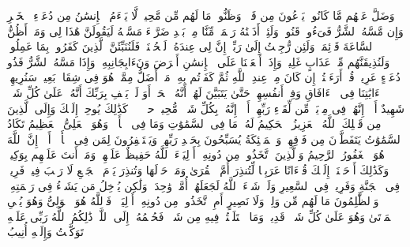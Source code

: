\stopbuffer%
\startbuffer[\q:41:48]
وَضَلَّ عَنۡهُم مَّا كَانُوا۟ یَدۡعُونَ مِن قَبۡلُۖ وَظَنُّوا۟ مَا لَهُم مِّن مَّحِیصࣲ%
\stopbuffer%
\startbuffer[\q:41:49]
لَّا یَسۡءَمُ ٱلۡإِنسَٰنُ مِن دُعَاۤءِ ٱلۡخَیۡرِ وَإِن مَّسَّهُ ٱلشَّرُّ فَیَءُوسࣱ قَنُوطࣱ%
\stopbuffer%
\startbuffer[\q:41:50]
وَلَئِنۡ أَذَقۡنَٰهُ رَحۡمَةࣰ مِّنَّا مِنۢ بَعۡدِ ضَرَّاۤءَ مَسَّتۡهُ لَیَقُولَنَّ هَٰذَا لِی وَمَاۤ أَظُنُّ ٱلسَّاعَةَ قَاۤئِمَةࣰ وَلَئِن رُّجِعۡتُ إِلَىٰ رَبِّیۤ إِنَّ لِی عِندَهُۥ لَلۡحُسۡنَىٰۚ فَلَنُنَبِّئَنَّ ٱلَّذِینَ كَفَرُوا۟ بِمَا عَمِلُوا۟ وَلَنُذِیقَنَّهُم مِّنۡ عَذَابٍ غَلِیظࣲ%
\stopbuffer%
\startbuffer[\q:41:51]
وَإِذَاۤ أَنۡعَمۡنَا عَلَى ٱلۡإِنسَٰنِ أَعۡرَضَ وَنَءَابِجَانِبِهِۦ وَإِذَا مَسَّهُ ٱلشَّرُّ فَذُو دُعَاۤءٍ عَرِیضࣲ%
\stopbuffer%
\startbuffer[\q:41:52]
قُلۡ أَرَءَیۡتُمۡ إِن كَانَ مِنۡ عِندِ ٱللَّهِ ثُمَّ كَفَرۡتُم بِهِۦ مَنۡ أَضَلُّ مِمَّنۡ هُوَ فِی شِقَاقِۭ بَعِیدࣲ%
\stopbuffer%
\startbuffer[\q:41:53]
سَنُرِیهِمۡ ءَایَٰتِنَا فِی ٱلۡءَافَاقِ وَفِیۤ أَنفُسِهِمۡ حَتَّىٰ یَتَبَیَّنَ لَهُمۡ أَنَّهُ ٱلۡحَقُّۗ أَوَ لَمۡ یَكۡفِ بِرَبِّكَ أَنَّهُۥ عَلَىٰ كُلِّ شَیۡءࣲ شَهِیدٌ%
\stopbuffer%
\startbuffer[\q:41:54]
أَلَاۤ إِنَّهُمۡ فِی مِرۡیَةࣲ مِّن لِّقَاۤءِ رَبِّهِمۡۗ أَلَاۤ إِنَّهُۥ بِكُلِّ شَیۡءࣲ مُّحِیطُۢ%
\stopbuffer%
\startbuffer[\q:42:1]
حمۤ%
\stopbuffer%
\startbuffer[\q:42:2]
عۤسۤقۤ%
\stopbuffer%
\startbuffer[\q:42:3]
كَذَٰلِكَ یُوحِیۤ إِلَیۡكَ وَإِلَى ٱلَّذِینَ مِن قَبۡلِكَ ٱللَّهُ ٱلۡعَزِیزُ ٱلۡحَكِیمُ%
\stopbuffer%
\startbuffer[\q:42:4]
لَهُۥ مَا فِی ٱلسَّمَٰوَٰتِ وَمَا فِی ٱلۡأَرۡضِۖ وَهُوَ ٱلۡعَلِیُّ ٱلۡعَظِیمُ%
\stopbuffer%
\startbuffer[\q:42:5]
تَكَادُ ٱلسَّمَٰوَٰتُ یَتَفَطَّرۡنَ مِن فَوۡقِهِنَّۚ وَٱلۡمَلَٰۤئِكَةُ یُسَبِّحُونَ بِحَمۡدِ رَبِّهِمۡ وَیَسۡتَغۡفِرُونَ لِمَن فِی ٱلۡأَرۡضِۗ أَلَاۤ إِنَّ ٱللَّهَ هُوَ ٱلۡغَفُورُ ٱلرَّحِیمُ%
\stopbuffer%
\startbuffer[\q:42:6]
وَٱلَّذِینَ ٱتَّخَذُوا۟ مِن دُونِهِۦۤ أَوۡلِیَاۤءَ ٱللَّهُ حَفِیظٌ عَلَیۡهِمۡ وَمَاۤ أَنتَ عَلَیۡهِم بِوَكِیلࣲ%
\stopbuffer%
\startbuffer[\q:42:7]
وَكَذَٰلِكَ أَوۡحَیۡنَاۤ إِلَیۡكَ قُرۡءَانًا عَرَبِیࣰّا لِّتُنذِرَ أُمَّ ٱلۡقُرَىٰ وَمَنۡ حَوۡلَهَا وَتُنذِرَ یَوۡمَ ٱلۡجَمۡعِ لَا رَیۡبَ فِیهِۚ فَرِیقࣱ فِی ٱلۡجَنَّةِ وَفَرِیقࣱ فِی ٱلسَّعِیرِ%
\stopbuffer%
\startbuffer[\q:42:8]
وَلَوۡ شَاۤءَ ٱللَّهُ لَجَعَلَهُمۡ أُمَّةࣰ وَٰحِدَةࣰ وَلَٰكِن یُدۡخِلُ مَن یَشَاۤءُ فِی رَحۡمَتِهِۦۚ وَٱلظَّٰلِمُونَ مَا لَهُم مِّن وَلِیࣲّ وَلَا نَصِیرٍ%
\stopbuffer%
\startbuffer[\q:42:9]
أَمِ ٱتَّخَذُوا۟ مِن دُونِهِۦۤ أَوۡلِیَاۤءَۖ فَٱللَّهُ هُوَ ٱلۡوَلِیُّ وَهُوَ یُحۡیِ ٱلۡمَوۡتَىٰ وَهُوَ عَلَىٰ كُلِّ شَیۡءࣲ قَدِیرࣱ%
\stopbuffer%
\startbuffer[\q:42:10]
وَمَا ٱخۡتَلَفۡتُمۡ فِیهِ مِن شَیۡءࣲ فَحُكۡمُهُۥۤ إِلَى ٱللَّهِۚ ذَٰلِكُمُ ٱللَّهُ رَبِّی عَلَیۡهِ تَوَكَّلۡتُ وَإِلَیۡهِ أُنِیبُ%
